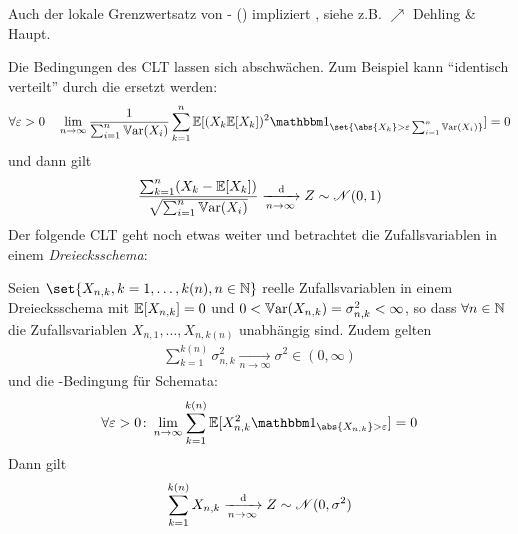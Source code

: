\begin{*remark}
	Auch der lokale Grenzwertsatz von - () impliziert , siehe z.B. $\nearrow$ Dehling \& Haupt.
\end{*remark}
Die Bedingungen des CLT lassen sich abschwächen. Zum Beispiel kann ``identisch verteilt'' durch die  ersetzt werden:
\begin{align*}
	\forall \epsilon > 0 \quad \lim_{n \to \infty} \frac{1}{\sum_{i=1}^n \Var(X_i)} \sum_{k=1}^n \E[(X_k \E[X_k])^2 \indi_{\set{\abs{X_k} > \epsilon \sum_{i=1}^n \Var(X_i)}}] = 0
\end{align*}
und dann gilt
\begin{align*}
	\frac{\sum_{k=1}^n (X_k - \mathbb{E}[X_k])}{\sqrt{\sum_{i=1}^n \mathbb{V}\text{ar}(X_i)}} \xrightarrow[n \to \infty]{\,\mathrm{d}} Z \sim \mathscr N(0,1)
\end{align*}
Der folgende CLT geht noch etwas weiter und  betrachtet die Zufallsvariablen in einem \emph{Dreiecksschema}:
\begin{proposition}
	Seien $\set{X_{n,k}, k=1,\dots,k(n),n \in \N}$ reelle Zufallsvariablen in einem Dreiecksschema mit $\mathbb{E}[X_{n,k}] = 0$ und $0 < \mathbb{V}\text{ar}(X_{n,k}) = \sigma_{n,k}^2 < \infty$, so dass $\forall n \in \mathbb{N}$ die Zufallsvariablen $X_{n,1}, \dots, X_{n,k(n)}$ unabhängig sind. Zudem gelten
	\begin{align*}
		\sum_{k=1}^{k(n)} \sigma_{n,k}^2 \xrightarrow[n \to \infty]{} \sigma^2 \in (0,\infty)
	\end{align*}
	und die -Bedingung für Schemata:
	\begin{align*}
		\forall \epsilon >0 \colon \lim_{n \to \infty} \sum_{k=1}^{k(n)} \E[X_{n,k}^2 \indi_{\abs{X_{n,k}}> \epsilon}] = 0
	\end{align*}
	Dann gilt
	\begin{align*}
		\sum_{k=1}^{k(n)} X_{n,k} \xrightarrow[n \to \infty]{\,\mathrm{d}} Z \sim \mathscr N(0, \sigma^2) 
	\end{align*}
\end{proposition}
